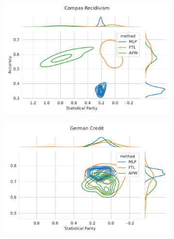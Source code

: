 \begin{figure}
\begin{subfigure}{.45\linewidth}
    \includegraphics[width=1\linewidth]{images/pareto_acc_parity_compas.pdf}
\end{subfigure}
\begin{subfigure}{.45\linewidth}
    \includegraphics[width=1\linewidth]{images/pareto_acc_parity_german.pdf}
\end{subfigure}
\end{figure}

